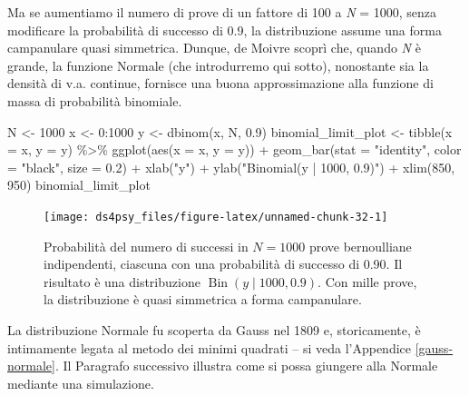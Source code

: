 \documentclass[
  11pt,
]{krantz}
\makeatletter
\newenvironment{Shaded}{\begin{snugshade}}{\end{snugshade}}
\newcommand{\AttributeTok}[1]{\textcolor[rgb]{0.61,0.61,0.61}{#1}}
\newcommand{\DecValTok}[1]{\textcolor[rgb]{0.06,0.06,0.06}{#1}}
\newcommand{\FloatTok}[1]{\textcolor[rgb]{0.06,0.06,0.06}{#1}}
\newcommand{\FunctionTok}[1]{\textcolor[rgb]{0,0,0}{#1}}
\newcommand{\NormalTok}[1]{#1}
\newcommand{\OtherTok}[1]{\textcolor[rgb]{0.37,0.37,0.37}{#1}}
\newcommand{\SpecialCharTok}[1]{\textcolor[rgb]{0,0,0}{#1}}
\newcommand{\StringTok}[1]{\textcolor[rgb]{0.5,0.5,0.5}{#1}}
\newenvironment{kframe}{%
\medskip{}
\setlength{\fboxsep}{.8em}
 \def\at@end@of@kframe{}%
 \ifinner\ifhmode%
  \def\at@end@of@kframe{\end{minipage}}%
  \begin{minipage}{\columnwidth}%
 \fi\fi%
 \def\FrameCommand##1{\hskip\@totalleftmargin \hskip-\fboxsep
 \colorbox{shadecolor}{##1}\hskip-\fboxsep
     \hskip-\linewidth \hskip-\@totalleftmargin \hskip\columnwidth}%
 \MakeFramed {\advance\hsize-\width
   \@totalleftmargin\z@ \linewidth\hsize
   \@setminipage}}%
 {\par\unskip\endMakeFramed%
 \at@end@of@kframe}
\renewenvironment{Shaded}{\begin{kframe}}{\end{kframe}}
\DeclareMathOperator{\Bin}{Bin} %
\theoremstyle{definition}
\theoremstyle{definition}
\theoremstyle{definition}
\theoremstyle{definition}
\theoremstyle{remark}
\makeatother
\begin{document}
Ma se aumentiamo il numero di prove di un fattore di 100 a \emph{N} = 1000, senza modificare la probabilità di successo di 0.9, la distribuzione assume una forma campanulare quasi simmetrica. Dunque, de Moivre scoprì che, quando \emph{N} è grande, la funzione Normale (che introdurremo qui sotto), nonostante sia la densità di v.a. continue, fornisce una buona approssimazione alla funzione di massa di probabilità binomiale.

\begin{Shaded}
\begin{Highlighting}[]
\NormalTok{N }\OtherTok{\textless{}{-}} \DecValTok{1000}
\NormalTok{x }\OtherTok{\textless{}{-}} \DecValTok{0}\SpecialCharTok{:}\DecValTok{1000}
\NormalTok{y }\OtherTok{\textless{}{-}} \FunctionTok{dbinom}\NormalTok{(x, N, }\FloatTok{0.9}\NormalTok{)}
\NormalTok{binomial\_limit\_plot }\OtherTok{\textless{}{-}}
  \FunctionTok{tibble}\NormalTok{(}\AttributeTok{x =}\NormalTok{ x, }\AttributeTok{y =}\NormalTok{ y) }\SpecialCharTok{\%\textgreater{}\%}
  \FunctionTok{ggplot}\NormalTok{(}\FunctionTok{aes}\NormalTok{(}\AttributeTok{x =}\NormalTok{ x, }\AttributeTok{y =}\NormalTok{ y)) }\SpecialCharTok{+}
  \FunctionTok{geom\_bar}\NormalTok{(}\AttributeTok{stat =} \StringTok{"identity"}\NormalTok{, }\AttributeTok{color =} \StringTok{"black"}\NormalTok{, }\AttributeTok{size =} \FloatTok{0.2}\NormalTok{) }\SpecialCharTok{+}
  \FunctionTok{xlab}\NormalTok{(}\StringTok{"y"}\NormalTok{) }\SpecialCharTok{+}
  \FunctionTok{ylab}\NormalTok{(}\StringTok{"Binomial(y | 1000, 0.9)"}\NormalTok{) }\SpecialCharTok{+}
  \FunctionTok{xlim}\NormalTok{(}\DecValTok{850}\NormalTok{, }\DecValTok{950}\NormalTok{)}
\NormalTok{binomial\_limit\_plot}
\end{Highlighting}
\end{Shaded}

\begin{figure}[h]

{\centering \texttt{[image: ds4psy\_files/figure-latex/unnamed-chunk-32-1]} 

}

\caption{Probabilità del numero di successi in $N = 1000$ prove bernoulliane indipendenti, ciascuna con una probabilità di successo di 0.90. Il risultato è una distribuzione $\Bin(y \mid 1000, 0.9)$. Con mille prove, la distribuzione è quasi simmetrica a forma campanulare.}\label{fig:unnamed-chunk-32}
\end{figure}

La distribuzione Normale fu scoperta da Gauss nel 1809 e, storicamente, è intimamente legata al metodo dei minimi quadrati -- si veda l'Appendice \ref{gauss-normale}. Il Paragrafo successivo illustra come si possa giungere alla Normale mediante una simulazione.
\end{document}
